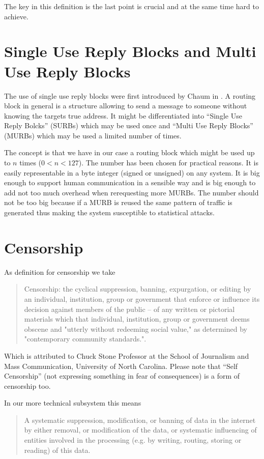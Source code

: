 The key in this definition is the last point is crucial and at the same time hard to achieve.

\section{Single Use Reply Blocks and Multi Use Reply Blocks}
The use of single use reply blocks were first introduced by Chaum in \cite{CHAUM1}. A routing block in general is a structure allowing to send a message to someone without knowing the targets true address. It might be differentiated into ``Single Use Reply Bolcks'' (SURBs) which may be used once and ``Multi Use Reply Blocks'' (MURBs) which may be used a limited number of times. 

The concept is that we have in our case a routing block which might be used up to $n$ times ($0<n<127$). The number has been chosen for practical reasons. It is easily representable in a byte integer (signed or unsigned) on any system. It is big enough to support human communication in a sensible way and is big enough to add not too much overhead when rerequesting more MURBs. The number should not be too big because if a MURB is reused the same pattern of traffic is generated thus making the system susceptible to statistical attacks.

\section{Censorship}
As definition for censorship we take
\begin{quote}
	Censorship: the cyclical suppression, banning, expurgation, or editing by an individual, institution, group or government that enforce or influence its decision against members of the public -- of any written or pictorial materials which that individual, institution, group or government deems obscene and "utterly without redeeming social value," as determined by "contemporary community standards.".
\end{quote}
Which is attributed to Chuck Stone Professor at the School of Journalism and Mass Communication, University of North Carolina. Please note that ``Self Censorship'' (not expressing something in fear of consequences) is a form of censorship too.

In our more technical subsystem this means
\begin{quote}
	A systematic suppression, modification, or banning of data in the internet by either removal, or modification of the data, or systematic influencing of entities involved in the processing (e.g. by writing, routing, storing or reading) of this data.
\end{quote}

